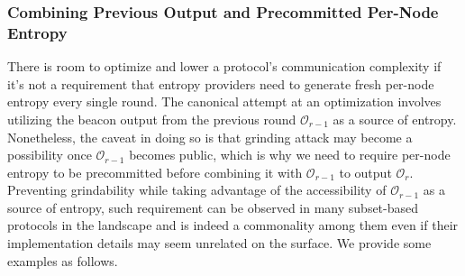 \documentclass[letterpaper,twocolumn,10pt]{article}
\theoremstyle{definition}
\theoremstyle{remark}
\begin{document}
\subsubsection{Combining Previous Output and Precommitted Per-Node Entropy}
\label{subsubsection:precommitted}
There is room to optimize and lower a protocol's communication complexity if it's not a requirement that entropy providers need to generate fresh per-node entropy every single round. The canonical attempt at an optimization involves utilizing the beacon output from the previous round $\mathcal{O}_{r - 1}$ as a source of entropy. Nonetheless, the caveat in doing so is that grinding attack may become a possibility once $\mathcal{O}_{r - 1}$ becomes public, which is why we need to require per-node entropy to be precommitted before combining it with $\mathcal{O}_{r - 1}$ to output $\mathcal{O}_r$. Preventing grindability while taking advantage of the accessibility of $\mathcal{O}_{r - 1}$ as a source of entropy, such requirement can be observed in many subset-based protocols in the landscape and is indeed a commonality among them even if their implementation details may seem unrelated on the surface. We provide some examples as follows.
\end{document}
